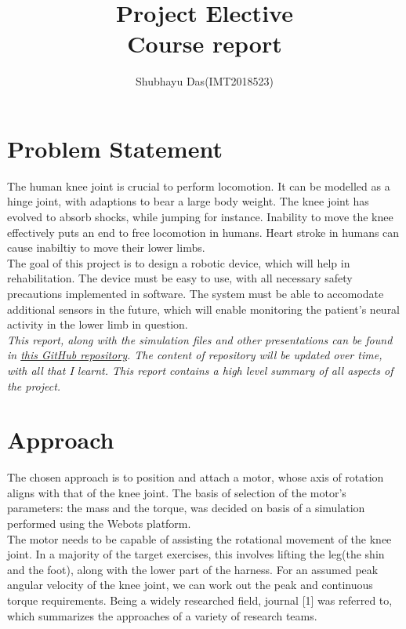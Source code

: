 \documentclass[a4paper]{article}
\title{Project Elective\\{\Large{Course report} }}
\author{Shubhayu Das(IMT2018523)}
\begin{document}
	\maketitle
	\tableofcontents

	\pagebreak

	\section{Problem Statement}
		The human knee joint is crucial to perform locomotion. It can be modelled as a hinge joint, with adaptions to bear a large body weight. The knee joint has evolved to absorb shocks, while jumping for instance. Inability to move the knee effectively puts an end to free locomotion in humans. Heart stroke in humans can cause inabiltiy to move their lower limbs.\\

		The goal of this project is to design a robotic device, which will help in rehabilitation. The device must be easy to use, with all necessary safety precautions implemented in software. The system must be able to accomodate additional sensors in the future, which will enable monitoring the patient's neural activity in the lower limb in question.\\

		\textit{This report, along with the simulation files and other presentations can be found in \href{https://github.com/Shubhayu-Das/PE_6th_sem}{this GitHub repository}. The content of repository will be updated over time, with all that I learnt. This report contains a high level summary of all aspects of the project.}

	\section{Approach}
		The chosen approach is to position and attach a motor, whose axis of rotation aligns with that of the knee joint. The basis of selection of the motor's parameters: the mass and the torque, was decided on basis of a simulation performed using the Webots platform.\\

		The motor needs to be capable of assisting the rotational movement of the knee joint. In a majority of the target exercises, this involves lifting the leg(the shin and the foot), along with the lower part of the harness. For an assumed peak angular velocity of the knee joint, we can work out the peak and continuous torque requirements. Being a widely researched field, journal [1] was referred to, which summarizes the approaches of a variety of research teams.\\
\end{document}
